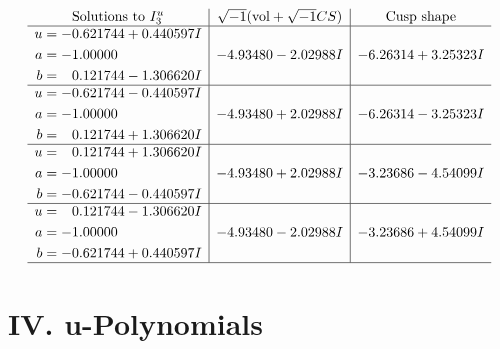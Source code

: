 \documentclass[1p]{elsarticle_modified}
\theoremstyle{definition}
\newcommand{\I}{\sqrt{-1}}
\begin{document}
$$\begin{array}{c|c|c}  
\text{Solutions to }I^u_{3}& \I (\text{vol} + \sqrt{-1}CS) & \text{Cusp shape}\\
 \hline 
\begin{aligned}
u &= -0.621744 + 0.440597 I \\
a &= -1.00000\phantom{ +0.000000I} \\
b &= \phantom{-}0.121744 - 1.306620 I\end{aligned}
 & -4.93480 - 2.02988 I & -6.26314 + 3.25323 I \\ \hline\begin{aligned}
u &= -0.621744 - 0.440597 I \\
a &= -1.00000\phantom{ +0.000000I} \\
b &= \phantom{-}0.121744 + 1.306620 I\end{aligned}
 & -4.93480 + 2.02988 I & -6.26314 - 3.25323 I \\ \hline\begin{aligned}
u &= \phantom{-}0.121744 + 1.306620 I \\
a &= -1.00000\phantom{ +0.000000I} \\
b &= -0.621744 - 0.440597 I\end{aligned}
 & -4.93480 + 2.02988 I & -3.23686 - 4.54099 I \\ \hline\begin{aligned}
u &= \phantom{-}0.121744 - 1.306620 I \\
a &= -1.00000\phantom{ +0.000000I} \\
b &= -0.621744 + 0.440597 I\end{aligned}
 & -4.93480 - 2.02988 I & -3.23686 + 4.54099 I\\
 \hline 
 \end{array}$$\newpage
\newpage\renewcommand{\arraystretch}{1}
\centering \section*{ IV. u-Polynomials}
\end{document}
